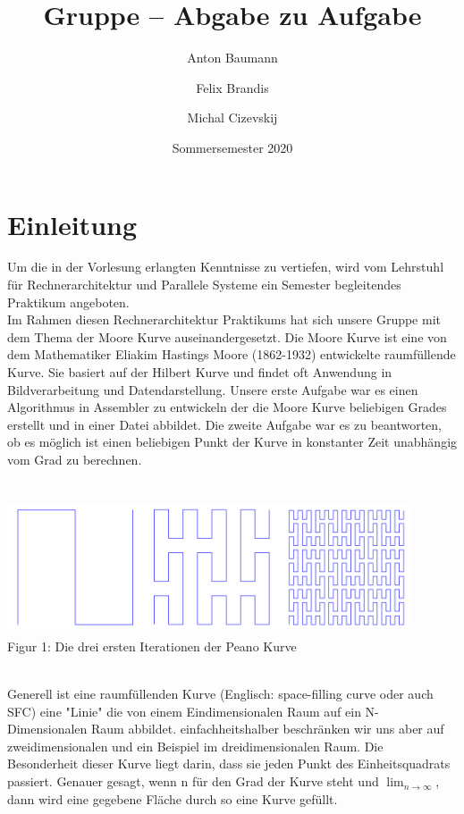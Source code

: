 \documentclass[course=erap]{aspdoc}
\author{Anton Baumann \and Felix Brandis \and Michal Cizevskij}
\date{Sommersemester 2020} %
\title{Gruppe \theGroup{} -- Abgabe zu Aufgabe \theNumber}
\begin{document}
\maketitle

\section{Einleitung}

Um die in der Vorlesung erlangten Kenntnisse zu vertiefen, wird vom Lehrstuhl für Rechnerarchitektur und Parallele Systeme ein Semester begleitendes Praktikum angeboten.\\
Im Rahmen diesen Rechnerarchitektur Praktikums hat sich unsere Gruppe mit dem Thema der Moore Kurve auseinandergesetzt. Die Moore Kurve ist eine von dem Mathematiker Eliakim Hastings Moore (1862-1932) entwickelte raumfüllende Kurve. Sie basiert auf der Hilbert Kurve und findet oft Anwendung in Bildverarbeitung und Datendarstellung. Unsere erste Aufgabe war es einen Algorithmus in Assembler zu entwickeln der die Moore Kurve beliebigen Grades erstellt und in einer Datei abbildet. Die zweite Aufgabe war es zu beantworten, ob es möglich ist einen beliebigen Punkt der Kurve in konstanter Zeit unabhängig vom Grad zu berechnen.\\
\\
\begin{center}
	\includegraphics[width=12cm, height=4cm]{Peano}\\ %
	\tiny Figur 1: Die drei ersten Iterationen der Peano Kurve
\end{center}
\	\\
Generell ist eine raumfüllenden Kurve (Englisch: space-filling curve oder auch SFC) eine "Linie" die von einem Eindimensionalen Raum auf ein N-Dimensionalen Raum abbildet. einfachheitshalber beschränken wir uns aber auf zweidimensionalen und ein Beispiel im dreidimensionalen Raum. Die Besonderheit dieser Kurve liegt darin, dass sie jeden Punkt des Einheitsquadrats passiert. Genauer gesagt, wenn n für den Grad der Kurve steht und $\lim_{n\to\infty}$, dann wird eine gegebene Fläche durch so eine Kurve gefüllt.\\
\end{document}
